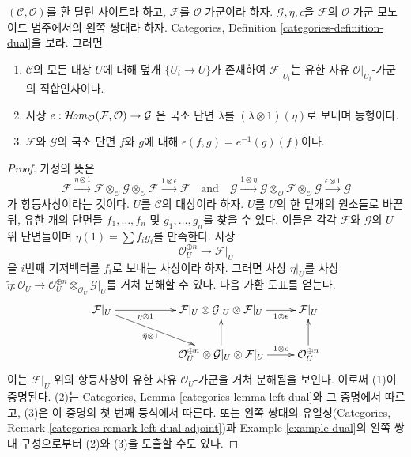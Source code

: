 \begin{lemma}
\label{lemma-left-dual-module}
$(\mathcal{C}, \mathcal{O})$를 환 달린 사이트라 하고, $\mathcal{F}$를
$\mathcal{O}$-가군이라 하자. $\mathcal{G}, \eta, \epsilon$을
$\mathcal{F}$의 $\mathcal{O}$-가군 모노이드 범주에서의 왼쪽 쌍대라 하자.
Categories, Definition \ref{categories-definition-dual}을 보라. 그러면
\begin{enumerate}
\item $\mathcal{C}$의 모든 대상 $U$에 대해 덮개 $\{U_i \to U\}$가 존재하여
$\mathcal{F}|_{U_i}$는 유한 자유 $\mathcal{O}|_{U_i}$-가군의 직합인자이다.
\item 사상
$e : \mathop{\mathcal{H}\!\mathit{om}}\nolimits_\mathcal{O}(\mathcal{F}, \mathcal{O}) \to \mathcal{G}$
은 국소 단면 $\lambda$를 $(\lambda \otimes 1)(\eta)$로 보내며 동형이다.
\item $\mathcal{F}$와 $\mathcal{G}$의 국소 단면 $f$와 $g$에 대해
$\epsilon(f, g) = e^{-1}(g)(f)$이다.
\end{enumerate}
\end{lemma}

\begin{proof}
가정의 뜻은
$$
\mathcal{F} \xrightarrow{\eta \otimes 1}
\mathcal{F} \otimes_\mathcal{O} \mathcal{G}
\otimes_\mathcal{O} \mathcal{F}
\xrightarrow{1 \otimes \epsilon} \mathcal{F}
\quad\text{and}\quad
\mathcal{G} \xrightarrow{1 \otimes \eta}
\mathcal{G} \otimes_\mathcal{O} \mathcal{F}
\otimes_\mathcal{O} \mathcal{G}
\xrightarrow{\epsilon \otimes 1} \mathcal{G}
$$
가 항등사상이라는 것이다. $U$를 $\mathcal{C}$의 대상이라 하자.
$U$를 $U$의 한 덮개의 원소들로 바꾼 뒤, 유한 개의 단면들
$f_1, \ldots, f_n$ 및 $g_1, \ldots, g_n$를 찾을 수 있다. 이들은 각각
$\mathcal{F}$와 $\mathcal{G}$의 $U$ 위 단면들이며
$\eta(1) = \sum f_i g_i$를 만족한다. 사상
$$
\mathcal{O}_U^{\oplus n} \to \mathcal{F}|_U
$$
을 $i$번째 기저벡터를 $f_i$로 보내는 사상이라 하자. 그러면 사상
$\eta|_U$를 사상
$\tilde \eta : \mathcal{O}_U \to
\mathcal{O}_U^{\oplus n} \otimes_{\mathcal{O}_U} \mathcal{G}|_U$를
거쳐 분해할 수 있다. 다음 가환 도표를 얻는다.
$$
\xymatrix{
\mathcal{F}|_U
\ar[rr]_-{\eta \otimes 1} \ar[rrd]_-{\tilde \eta \otimes 1} & &
\mathcal{F}|_U \otimes \mathcal{G}|_U \otimes \mathcal{F}|_U
\ar[r]_-{1 \otimes \epsilon} &
\mathcal{F}|_U \\
& &
\mathcal{O}_U^{\oplus n} \otimes \mathcal{G}|_U \otimes \mathcal{F}|_U
\ar[u] \ar[r]^-{1 \otimes \epsilon} &
\mathcal{O}_U^{\oplus n} \ar[u]
}
$$
이는 $\mathcal{F}|_U$ 위의 항등사상이 유한 자유 $\mathcal{O}_U$-가군을
거쳐 분해됨을 보인다. 이로써 (1)이 증명된다. (2)는 Categories, Lemma
\ref{categories-lemma-left-dual}와 그 증명에서 따르고, (3)은 이 증명의
첫 번째 등식에서 따른다. 또는 왼쪽 쌍대의 유일성(Categories, Remark
\ref{categories-remark-left-dual-adjoint})과 Example
\ref{example-dual}의 왼쪽 쌍대 구성으로부터 (2)와 (3)을 도출할 수도 있다.
\end{proof}

